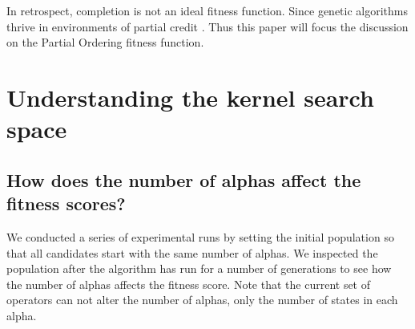\documentclass[3p,times,procedia]{elsarticle}
\begin{document}

In retrospect, completion is not an ideal fitness function. Since genetic algorithms thrive in environments of partial credit \cite{Eiben2003}. Thus this paper will focus the discussion on the Partial Ordering fitness function.

\section{Understanding the kernel search space}


\subsection{How does the number of alphas affect the fitness scores?}
We conducted a series of experimental runs by setting the initial population so that all candidates start with the same number of alphas. We inspected the population after the algorithm has run for a number of generations to see how the number of alphas affects the fitness score. Note that the current set of operators can not alter the number of alphas, only the number of states in each alpha.
\end{document}
